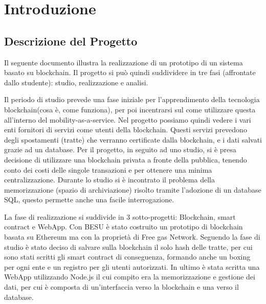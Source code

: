\documentclass[11pt,a4paper,titlepage, twoside, openright]{report}
\begin{document}
\begin{frontespizio}
\end{frontespizio}


\tableofcontents

\chapter{Introduzione}
\section{Descrizione del Progetto}
Il seguente documento illustra la realizzazione di un prototipo di un sistema basato su blockchain. Il progetto si può quindi suddividere in tre fasi (affrontate dallo studente): studio, realizzazione e analisi. 

Il periodo di studio prevede una fase iniziale per l'apprendimento della tecnologia blockchain(cosa è, come funziona), per poi incentrarsi sul come utilizzare questa all'interno del mobility-as-a-service. Nel progetto possiamo quindi vedere i vari enti fornitori di servizi come utenti della blockchain. Questi servizi prevedono degli spostamenti (tratte) che verranno certificate dalla blockchain, e i dati salvati grazie ad un database. Per il progetto, in seguito ad uno studio, si è presa decisione di utilizzare una blockchain privata a fronte della pubblica, tenendo conto dei costi delle singole transazioni e per ottenere una minima centralizzazione.
Durante lo studio si è incontrato il problema della memorizzazione (spazio di archiviazione) risolto tramite l'adozione di un database SQL, questo permette anche una facile interrogazione.

La fase di realizzazione si suddivide in 3 sotto-progetti: Blockchain, smart contract e WebApp.
Con BESU è stato costruito un prototipo di blockchain basata su Ethereum ma con la proprietà di Free gas Network. Seguendo la fase di studio è stato deciso di salvare sulla blockchain il solo hash delle tratte, per cui sono stati scritti gli smart contract di conseguenza, formando anche un boxing per ogni ente e un registro per gli utenti autorizzati.
In ultimo è stata scritta una WebApp utilizzando Node.js il cui compito era la memorizzazione e gestione dei dati, per cui è composta di un'interfaccia verso la blockchain e una verso il database.
\end{document}
